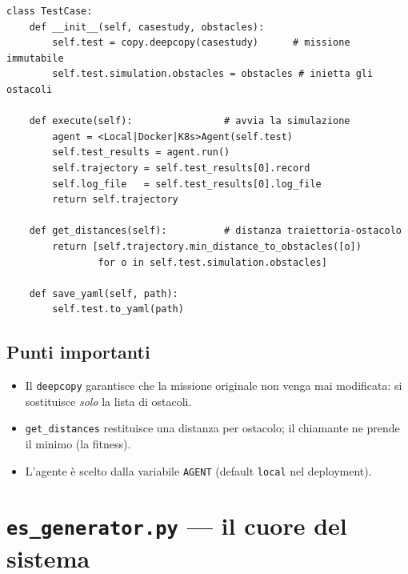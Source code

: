 \documentclass[11pt,a4paper]{report}
\newcommand{\code}[1]{\texttt{#1}}
\begin{document}
\begin{lstlisting}[style=py]
class TestCase:
    def __init__(self, casestudy, obstacles):
        self.test = copy.deepcopy(casestudy)      # missione immutabile
        self.test.simulation.obstacles = obstacles # inietta gli ostacoli

    def execute(self):                # avvia la simulazione
        agent = <Local|Docker|K8s>Agent(self.test)
        self.test_results = agent.run()
        self.trajectory = self.test_results[0].record
        self.log_file   = self.test_results[0].log_file
        return self.trajectory

    def get_distances(self):          # distanza traiettoria-ostacolo
        return [self.trajectory.min_distance_to_obstacles([o])
                for o in self.test.simulation.obstacles]

    def save_yaml(self, path):
        self.test.to_yaml(path)
\end{lstlisting}

\subsection{Punti importanti}
\begin{itemize}
  \item Il \code{deepcopy} garantisce che la missione originale non venga
        mai modificata: si sostituisce \emph{solo} la lista di ostacoli.
  \item \code{get\_distances} restituisce una distanza per ostacolo; il
        chiamante ne prende il minimo (la fitness).
  \item L'agente è scelto dalla variabile \code{AGENT} (default
        \code{local} nel deployment).
\end{itemize}

\section{\texttt{es\_generator.py} --- il cuore del sistema}
\label{sec:esgen}
\end{document}
